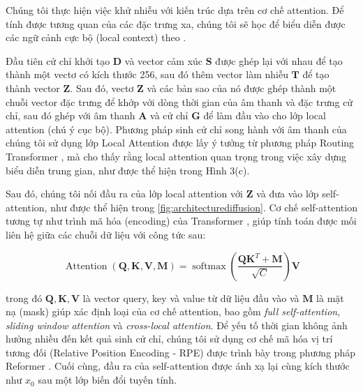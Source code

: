 Chúng tôi thực hiện việc khử nhiễu với kiến trúc dựa trên cơ chế attention. Để tính được tương quan của các đặc trưng xa, chúng tôi sẽ học để biểu diễn được các ngữ cảnh cực bộ (local context) theo \cite{rae2020transformers}.

Đầu tiên cử chỉ khởi tạo $\mathbf{D}$ và vector cảm xúc $\mathbf{S}$ được ghép lại với nhau để tạo thành một vectơ có kích thước 256, sau đó thêm vector làm nhiễu $\mathbf{T}$ để tạo thành vector $\mathbf{Z}$. 
Sau đó, vectơ $\mathbf{Z}$ và các bản sao của nó được ghép thành một chuỗi vector đặc trưng để khớp với dòng thời gian của âm thanh và đặc trưng cử chỉ, sau đó ghép với âm thanh $\mathbf{A}$ và cử chỉ $\mathbf{G}$ để làm đầu vào cho lớp local attention (chú ý cục bộ). 
Phương pháp sinh cử chỉ song hành với âm thanh của chúng tôi sử dụng lớp Local Attention được lấy ý tưởng từ phương pháp Routing Transformer \cite{roy2021efficient}, mà cho thấy rằng local attention quan trọng trong việc xây dựng biểu diễn trung gian, như được thể hiện trong Hình 3(c).

Sau đó, chúng tôi nối đầu ra của lớp local attention với $\mathbf{Z}$ và đưa vào lớp self-attention, như được thể hiện trong \autoref{fig:architecturediffusion}. Cơ chế self-attention tương tự như trình mã hóa (encoding) của Transformer \cite{vaswani2017attention}, giúp tính toán được mối liên hệ giữa các chuỗi dữ liệu với công tức sau:


\begin{equation} \label{eq:attention}
\operatorname{Attention}(\mathbf{Q}, \mathbf{K}, \mathbf{V}, \mathbf{M})=\operatorname{softmax}\left(\frac{\mathbf{Q} \mathbf{K}^{T}+\mathbf{M}}{\sqrt{C}}\right) \mathbf{V}
\end{equation}

trong đó $\mathbf{Q}, \mathbf{K}, \mathbf{V}$ là vector query, key và value từ dữ liệu đầu vào và $\mathbf{M}$ là mặt nạ (mask) giúp xác định loại của cơ chế attention, bao gồm \textit{full self-attention}, \textit{sliding window attention} và \textit{cross-local attention}. Để yếu tố thời gian không ảnh hưởng nhiều đến kết quả sinh cử chỉ, chúng tôi sử dụng cơ chế mã hóa vị trí tương đối (Relative Position Encoding - RPE) được trình bày trong phương pháp Reformer \cite{kitaev2020reformer}. Cuối cùng, đầu ra của self-attention được ánh xạ lại cùng kích thước như $x_{0}$ sau một lớp biến đổi tuyến tính.

